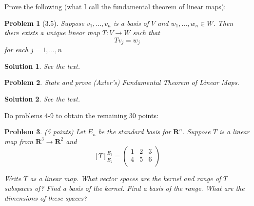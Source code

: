 \documentclass{article}
\theoremstyle{problemstyle}
\newtheorem{problem}{Problem}
\theoremstyle{problemstyle}
\newtheorem{solution}{Solution}
\theoremstyle{problemstyle}
\begin{document}
Prove the following (what I call the fundamental theorem of linear maps): 

\begin{problem}[3.5]
Suppose $v_1,...,v_n$ is a basis of $V$ and $w_1, ..., w_n \in W$. Then there exists a unique linear map $T:V \rightarrow W$ such that $$Tv_j = w_j$$ for each $j = 1,...,n$
\end{problem}

\begin{solution}
See the text. 
\end{solution}

\begin{problem}
State and prove (Axler's) Fundamental Theorem of Linear Maps. 
\end{problem}

\begin{solution}
See the text. 
\end{solution}

Do problems 4-9 to obtain the remaining $30$ points:

\begin{problem}
(5 points) Let $E_n$ be the standard basis for $\textbf{R}^n$. Suppose $T$ is a linear map from $\textbf{R}^3 \rightarrow \textbf{R}^2$ and 
$$[T]^{E_3}_{E_2} = \begin{pmatrix} 1 & 2 & 3  \\
 4 & 5& 6   \\
\end{pmatrix}$$

Write $T$ as a linear map. What vector spaces are the kernel and range of $T$ subspaces of?  Find a basis of the kernel. Find a basis of the range.  What are the dimensions of these spaces? 
\end{problem}
\end{document}
